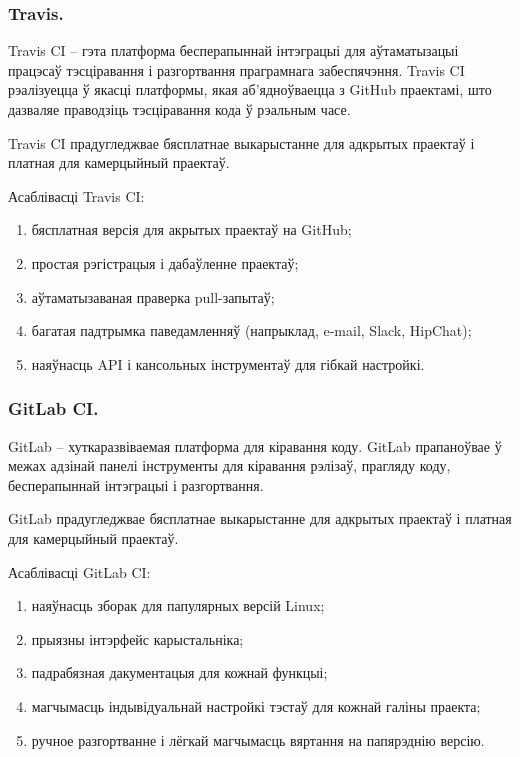 \subsubsection{Travis.}

Travis CI -- гэта платформа бесперапыннай інтэграцыі для аўтаматызацыі
працэсаў тэсціравання і разгортвання праграмнага забеспячэння.
Travis CI рэалізуецца ў якасці платформы, якая аб'ядноўваецца з
GitHub праектамі, што дазваляе праводзіць тэсціравання кода
ў рэальным часе.

Travis CI прадугледжвае бясплатнае выкарыстанне для адкрытых праектаў і
платная для камерцыйный праектаў.

Асаблівасці Travis CI:
\begin{enumerate}
    \item бясплатная версія для акрытых праектаў на GitHub;
    \item простая рэгістрацыя і дабаўленне праектаў;
    \item аўтаматызаваная праверка pull-запытаў;
    \item багатая падтрымка паведамленняў
          (напрыклад, e-mail, Slack, HipChat);
    \item наяўнасць API і кансольных інструментаў для
          гібкай настройкі.
\end{enumerate}

\subsubsection{GitLab CI.}

GitLab -- хуткаразвіваемая платформа для кіравання коду.
GitLab прапаноўвае ў межах адзінай панелі
інструменты для кіравання рэлізаў,
прагляду коду, бесперапыннай інтэграцыі і разгортвання.

GitLab прадугледжвае бясплатнае выкарыстанне для адкрытых праектаў і
платная для камерцыйный праектаў.

Асаблівасці GitLab CI:
\begin{enumerate}
    \item наяўнасць зборак для папулярных версій Linux;
    \item прыязны інтэрфейс карыстальніка;
    \item падрабязная дакументацыя для кожнай функцыі;
    \item магчымасць індывідуальнай настройкі тэстаў
          для кожнай галіны праекта;
    \item ручное разгортванне і лёгкай магчымасць вяртання
          на папярэднію версію.
\end{enumerate}

